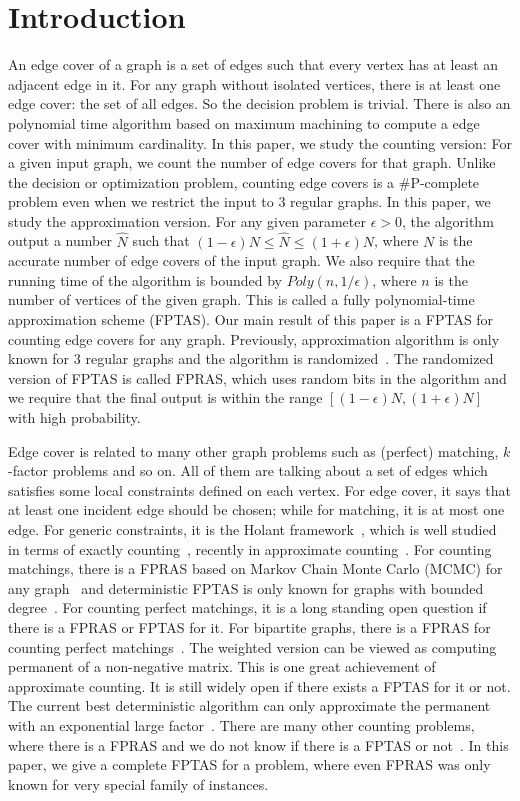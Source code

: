 \section{Introduction}
An edge cover of a graph is a set of edges such that every vertex has at least an adjacent edge in it.
 For any graph without isolated vertices, there is at least one edge cover: the set of all edges. So the decision problem is trivial. There is also an polynomial time algorithm based on maximum machining to compute a edge cover with minimum cardinality.     In this paper, we study the counting version: 
 For a given input graph, we count the number of edge covers for that graph. Unlike the decision or optimization problem, counting edge covers is a \#P-complete problem even when we restrict the input to 3 regular graphs. In this paper, we study the approximation version. For any given parameter $\epsilon>0$, the algorithm output a number $\hat{N}$ such that $(1-\epsilon) N\leq \hat{N} \leq (1+\epsilon) N$, where $N$ is the accurate number of edge covers of the input graph. We also require that the running time of the algorithm is bounded by $Poly(n,1/\epsilon)$, where $n$ is the number of vertices of the given graph. This is called a fully polynomial-time approximation scheme (FPTAS). Our main result of this paper is a FPTAS for counting edge covers for any graph. Previously, approximation algorithm is only known for 3 regular graphs and the algorithm is randomized~\cite{MFCS09}. The randomized version of FPTAS is called FPRAS, which uses random bits in the algorithm and we require that the final output is within the range $[(1-\epsilon) N, (1+\epsilon) N]$ with high probability.

Edge cover is related to many other graph problems such as (perfect) matching, $k$-factor problems and so on. All of them are talking about a set of edges which satisfies some local constraints defined on each vertex. For edge cover, it says that at least one incident edge should be chosen; while for matching, it is at most one edge. For generic constraints, it is the Holant framework~\cite{STOC09,holant}, which is well studied in terms of exactly counting~\cite{holant,HuangL12,CaiGW13}, recently in approximate counting~\cite{McQuillan2013,fibo-approx}. For counting matchings, there is a FPRAS based on Markov Chain Monte Carlo (MCMC) for any graph~\cite{} and deterministic FPTAS is only known for graphs with bounded degree~\cite{BGKNT07}. For counting perfect matchings, it is a long standing open question if there is a FPRAS or FPTAS for it. For bipartite graphs, there is a FPRAS for counting perfect matchings~\cite{}. The weighted version can be viewed as  computing permanent of a non-negative matrix. This is one great achievement of approximate counting. It is still widely open if there exists a FPTAS for it or not. The current best deterministic algorithm can only approximate the permanent with an exponential large factor~\cite{}. There are many other counting problems, where there is a FPRAS and we do not know if there is a FPTAS or not~\cite{}. In this paper, we give a complete FPTAS for a problem, where even FPRAS was only known for very special family of instances.

